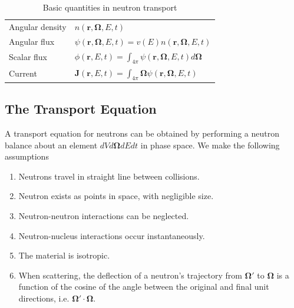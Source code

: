 \documentclass[11pt]{article}
\renewcommand\vec{\mathbf}
\begin{document}
\begin{table}
  \centering
  \caption{Basic quantities in neutron transport}
  \begin{tabular}{ll}
  \hline
  Angular density & $n(\vec{r},\vec{\Omega},E,t)$ \\
  Angular flux & $\psi(\vec{r},\vec{\Omega},E,t) = v(E) n(\vec{r},\vec{\Omega},E,t)$ \\
  Scalar flux & $\phi(\vec{r},E,t) = \int_{4\pi} \psi(\vec{r},\vec{\Omega},E,t) d\vec{\Omega}$ \\
  Current & $\vec{J}(\vec{r},E,t) = \int_{4\pi} \vec{\Omega} \psi(\vec{r},\vec{\Omega},E,t)$ \\
  \hline
  \end{tabular}
\end{table}

\subsection{The Transport Equation}
\label{sec:orgheadline53}
A transport equation for neutrons can be obtained by performing a neutron balance about an element \(dV d\vec{\Omega} dE dt\) in phase space.  We make the following assumptions
\begin{enumerate}
\item Neutrons travel in straight line between collisions.
\item Neutron exists as points in space, with negligible size.
\item Neutron-neutron interactions can be neglected.
\item Neutron-nucleus interactions occur instantaneously.
\item The material is isotropic.
\item When scattering, the deflection of a neutron's trajectory from \(\vec{\Omega}'\) to \(\vec{\Omega}\) is a function of the cosine of the angle between the original and final unit directions, i.e. \(\vec{\Omega}' \cdot \vec{\Omega}\).
\end{enumerate}
\end{document}
